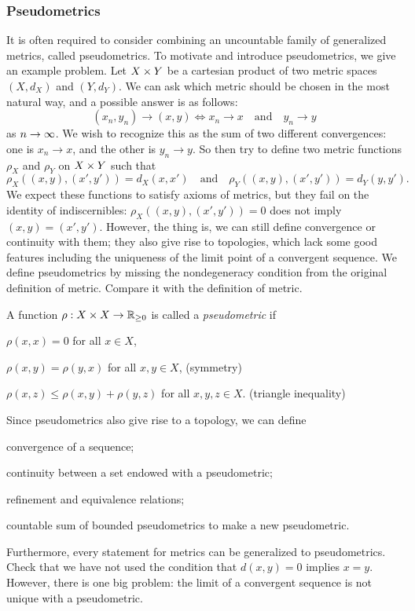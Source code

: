 \subsubsection{Pseudometrics}
It is often required to consider combining an uncountable family of generalized metrics, called pseudometrics.
To motivate and introduce pseudometrics, we give an example problem.
Let $X\times Y$ be a cartesian product of two metric spaces $(X,d_X)$ and $(Y,d_Y)$.
We can ask which metric should be chosen in the most natural way, and a possible answer is as follows:
\[(x_n,y_n)\to(x,y)\iff x_n\to x\quad\text{and}\quad y_n\to y\]
as $n\to\oo$.
We wish to recognize this as the sum of two different convergences: one is $x_n\to x$, and the other is $y_n\to y$.
So then try to define two metric functions $\rho_X$ and $\rho_Y$ on $X\times Y$ such that
\[\rho_X((x,y),(x',y'))=d_X(x,x')\quad\text{and}\quad\rho_Y((x,y),(x',y'))=d_Y(y,y').\]
We expect these functions to satisfy axioms of metrics, but they fail on the identity of indiscernibles: $\rho_X((x,y),(x',y'))=0$ does not imply $(x,y)=(x',y')$.
However, the thing is, we can still define convergence or continuity with them; they also give rise to topologies, which lack some good features including the uniqueness of the limit point of a convergent sequence.
We define pseudometrics by missing the nondegeneracy condition from the original definition of metric.
Compare it with the definition of metric.

\begin{defn}
A function $\rho:X\x X\to\R_{\ge0}$ is called a \emph{pseudometric} if
\begin{cond}
\item $\rho(x,x)=0$ for all $x\in X$,
\item $\rho(x,y)=\rho(y,x)$ for all $x,y\in X$, \hfill(symmetry)
\item $\rho(x,z)\le \rho(x,y)+\rho(y,z)$ for all $x,y,z\in X$. \hfill(triangle inequality)
\end{cond}
\end{defn}

Since pseudometrics also give rise to a topology, we can define
\begin{cond}
\item convergence of a sequence;
\item continuity between a set endowed with a pseudometric;
\item refinement and equivalence relations;
\item countable sum of bounded pseudometrics to make a new pseudometric.
\end{cond}
Furthermore, every statement for metrics can be generalized to pseudometrics.
Check that we have not used the condition that $d(x,y)=0$ implies $x=y$.
However, there is one big problem: the limit of a convergent sequence is not unique with a pseudometric.

